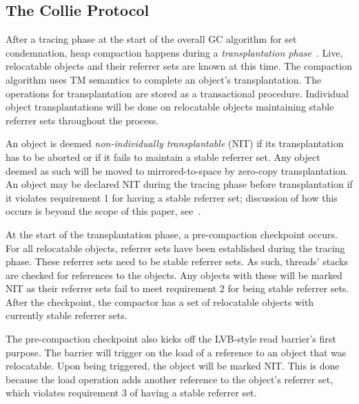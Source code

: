 \documentclass{sig-alternate}
\begin{document}


\subsection{The Collie Protocol}
\label{sec:collieProtocol}

After a tracing phase at the start of the overall GC algorithm for set condemnation, heap compaction
happens during a \emph{transplantation phase}~\cite{Iyengar:Collie}.
Live, relocatable objects and their referrer sets are known at this time. The compaction 
algorithm uses TM semantics to complete an object's
transplantation. The operations for transplantation are stored as a
transactional procedure. Individual object transplantations will be done on relocatable objects 
maintaining stable referrer sets throughout the process.

An object is deemed \emph{non-individually transplantable} (NIT) if its transplantation
has to be aborted or if it fails to maintain a stable referrer set. 
Any object deemed as such will be moved to mirrored-to-space by zero-copy 
transplantation. An object may be declared NIT during the tracing phase before transplantation
if it violates requirement 1 for having a stable referrer set; discussion
of how this occurs is beyond the scope of this paper, see~\cite{Iyengar:Collie}.

At the start of the transplantation phase, a pre-compaction checkpoint occurs.
For all relocatable objects, referrer sets have been established during the tracing phase.
These referrer sets need to be stable referrer sets. As such, threads' stacks are checked 
for references to the objects. Any objects with these will be 
marked NIT as their referrer sets fail to meet requirement 2 for being stable referrer sets.
After the checkpoint, the compactor has a set of relocatable objects with currently stable referrer sets.

The pre-compaction checkpoint also kicks off the LVB-style read barrier's first purpose. 
The barrier will trigger on the load of a reference to an object that was 
relocatable. Upon being triggered, the object will be marked NIT. This is done because
the load operation adds another reference to the object's referrer set, which violates
requirement 3 of having a stable referrer set.
\end{document}
